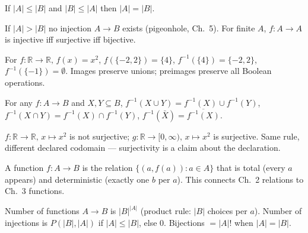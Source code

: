 \begin{theorem}
If $|A|\le|B|$ and $|B|\le|A|$ then $|A|=|B|$.
\end{theorem}

\begin{remark}
If $|A|>|B|$ no injection $A\to B$ exists (pigeonhole, Ch.~5). For finite $A$, $f:A\to A$ is injective iff surjective iff bijective.
\end{remark}


\begin{example}
For $f:\mathbb{R}\to\mathbb{R},\,f(x)=x^2$, $f(\{-2,2\})=\{4\}$, $f^{-1}(\{4\})=\{-2,2\}$, $f^{-1}(\{-1\})=\emptyset$. Images preserve unions; preimages preserve all Boolean operations.
\end{example}

\begin{theorem}
For any $f:A\to B$ and $X,Y\subseteq B$, $f^{-1}(X\cup Y)=f^{-1}(X)\cup f^{-1}(Y)$, $f^{-1}(X\cap Y)=f^{-1}(X)\cap f^{-1}(Y)$, $f^{-1}(\bar X)=\overline{f^{-1}(X)}$.
\end{theorem}

\begin{remark}
$f:\mathbb{R}\to\mathbb{R},\,x\mapsto x^2$ is not surjective; $g:\mathbb{R}\to[0,\infty),\,x\mapsto x^2$ is surjective. Same rule, different declared codomain --- surjectivity is a claim about the declaration.
\end{remark}

\begin{remark}
A function $f:A\to B$ is the relation $\{(a,f(a)):a\in A\}$ that is total (every $a$ appears) and deterministic (exactly one $b$ per $a$). This connects Ch.~2 relations to Ch.~3 functions.
\end{remark}

\begin{example}
Number of functions $A\to B$ is $|B|^{|A|}$ (product rule: $|B|$ choices per $a$). Number of injections is $P(|B|,|A|)$ if $|A|\le|B|$, else $0$. Bijections $=|A|!$ when $|A|=|B|$.
\end{example}

